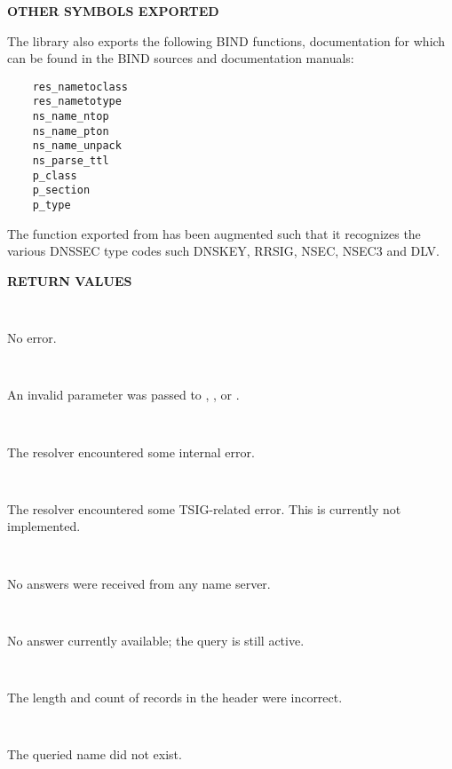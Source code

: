 {\bf OTHER SYMBOLS EXPORTED}

The  library also exports the following BIND functions,
documentation for which can be found in the BIND sources and documentation
manuals:

\begin{verbatim}
    res_nametoclass
    res_nametotype
    ns_name_ntop
    ns_name_pton
    ns_name_unpack
    ns_parse_ttl
    p_class
    p_section
    p_type
\end{verbatim}

The  function exported from  has been augmented
such that it recognizes the various DNSSEC type codes such DNSKEY, RRSIG,
NSEC, NSEC3 and DLV.

{\bf RETURN VALUES}

\begin{description}

\item {}\verb" "

No error.

\item {}\verb" "

An invalid parameter was passed to , , or
.

\item {}\verb" "

The resolver encountered some internal error.

\item {}\verb" "

The resolver encountered some TSIG-related error.  This is currently
not implemented.

\item {}\verb" "

No answers were received from any name server.

\item {}\verb" "

No answer currently available; the query is still active.

\item {}\verb" "

The length and count of records in the header were incorrect.

\item {}\verb" "

The queried name did not exist.


\end{description}
